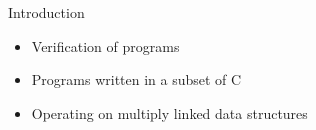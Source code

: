\begin{frame}[fragile]{Introduction}
	\pause
	\begin{itemize}
		\item <2-> Verification of programs
		\item <3-> Programs written in a subset of C
		\item <4-> Operating on multiply linked data structures
	\end{itemize}
\end{frame}